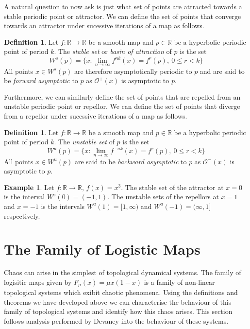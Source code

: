 \documentclass[11pt,a4paper,oneside]{memoir}
\theoremstyle{plain}
\theoremstyle{definition}
\newtheorem{defn}[thm]{Definition}
\newtheorem{exmp}[thm]{Example}
\begin{document}
A natural question to now ask is just what set of points are attracted towards a stable periodic point or attractor. We can define the set of points that converge towards an attractor under sucessive iterations of a map as follows.

\begin{defn}
    Let $f: \mathbb{R} \to \mathbb{R}$ be a smooth map and $p \in \mathbb{R}$ be a hyperbolic periodic point of period $k$. The \emph{stable set} or \emph{basin of attraction} of $p$ is the set \[W^s(p) = \lbrace x : \lim_{n \to \infty} f^{nk}(x) = f^r(p), \ 0 \leq r < k \rbrace\] All points $x \in W^s(p)$ are therefore asymptotically periodic to $p$ and are said to be \emph{forward asymptotic} to $p$ as $\mathcal{O}^+(x)$ is asymptotic to $p$.
\end{defn}

Furthermore, we can similarly define the set of points that are repelled from an unstable periodic point or repellor. We can define the set of points that diverge from a repellor under sucessive iterations of a map as follows.

\begin{defn}
    Let $f: \mathbb{R} \to \mathbb{R}$ be a smooth map and $p \in \mathbb{R}$ be a hyperbolic periodic point of period $k$. The \emph{unstable set} of $p$ is the set \[W^u(p) = \lbrace x : \lim_{n \to \infty} f^{-nk}(x) = f^r(p), \ 0 \leq r < k \rbrace\] All points $x \in W^u(p)$ are said to be \emph{backward asymptotic} to $p$ as $\mathcal{O}^-(x)$ is asymptotic to $p$.
\end{defn}

\begin{exmp}
    Let $f: \mathbb{R} \to \mathbb{R}$, $f(x) = x^3$. The stable set of the attractor at $x = 0$ is the interval $W^s(0) = (-1, 1)$. The unstable sets of the repellors at $x = 1$ and $x = -1$ is the intervals $W^u(1) = [1, \infty)$ and $W^u(-1) = (\infty, 1]$ respectively.
\end{exmp}

\section{The Family of Logistic Maps} \label{sec:logistic_maps}
Chaos can arise in the simplest of topological dynamical systems. The family of logisitic maps given by $F_\mu(x) = \mu x(1-x)$ is a family of non-linear topological systems which exibit chaotic phenomena. Using the definitions and theorems we have developed above we can characterise the behaviour of this family of topological systems and identify how this chaos arises. This section follows analysis performed by Devaney \cite[Section 1.5]{devaney} into the behaviour of these systems.
\end{document}
